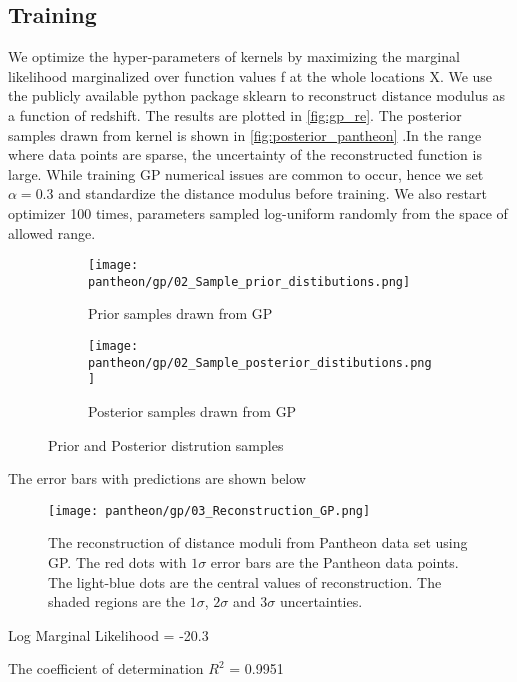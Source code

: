 \subsection{Training}
We optimize the hyper-parameters of kernels by maximizing the marginal likelihood marginalized over function values f at the whole locations X. We use the publicly available python package sklearn\cite{scikit-learn} to reconstruct distance modulus as a function of redshift. The results are plotted in \eqref{fig:gp_re}. The posterior samples drawn from kernel is shown in \eqref{fig:posterior_pantheon} .In the range where data points are sparse, the uncertainty of the reconstructed function is large. While training GP numerical issues are common to occur, hence we set $\alpha=0.3$ and standardize the distance modulus before training. We also restart optimizer 100 times, parameters sampled log-uniform randomly from the space of allowed range.

\begin{figure}[H]
	\centering
	\begin{subfigure}[t]{0.5\textwidth}
		\centering
		\texttt{[image: pantheon/gp/02\_Sample\_prior\_distibutions.png]}
		\caption{Prior samples drawn from GP}
		\label{fig:prior_pantheon}
	\end{subfigure}%
	\begin{subfigure}[t]{0.5\textwidth}
		\centering
		\texttt{[image: pantheon/gp/02\_Sample\_posterior\_distibutions.png]}
		\caption{Posterior samples drawn from GP}
		\label{fig:posterior_pantheon}
	\end{subfigure}
	\caption{Prior and Posterior distrution samples}
	\label{prior_posterior_pantheon_gp}
\end{figure}

The error bars with predictions are shown below
\begin{figure}[H]
	\centering
	\texttt{[image: pantheon/gp/03\_Reconstruction\_GP.png]}
	\caption{The reconstruction of distance moduli from Pantheon data set using GP. The red dots with $1\sigma$ error bars are the Pantheon data points. The light-blue dots are the central values of reconstruction. The shaded regions are the $1\sigma$, $2\sigma$ and $3\sigma$ uncertainties.}
	\label{fig:gp_re}
\end{figure}

Log Marginal Likelihood = -20.3

The coefficient of determination $R^2$ = 0.9951